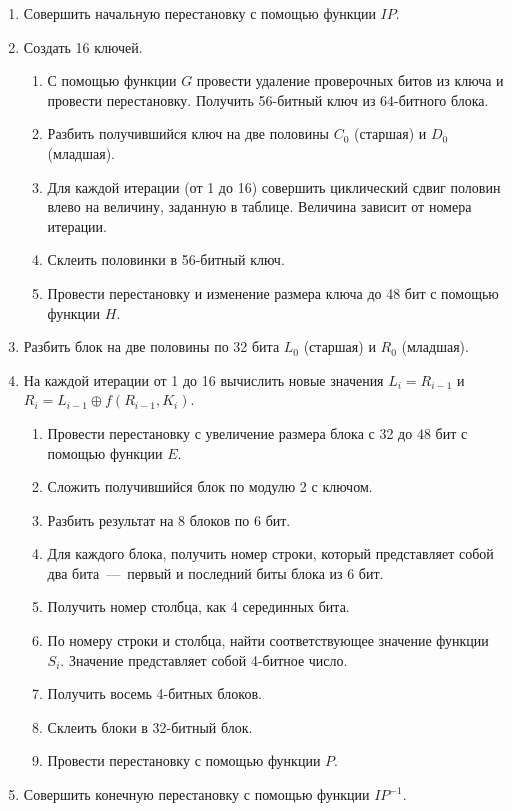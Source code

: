 \begin{enumerate}
	\item Совершить начальную перестановку с помощью функции $IP$.
	\item Создать 16 ключей.
	
	\begin{enumerate}
		\item С помощью функции $G$ провести удаление проверочных битов из ключа и провести перестановку. Получить 56-битный ключ из 64-битного блока.
		\item Разбить получившийся ключ на две половины $C_0$ (старшая) и $D_0$ (младшая).
		\item Для каждой итерации (от 1 до 16) совершить циклический сдвиг половин влево на величину, заданную в таблице. Величина зависит от номера итерации.
		\item Склеить половинки в 56-битный ключ.
		\item Провести перестановку и изменение размера ключа до 48 бит с помощью функции $H$.
	\end{enumerate}
	
	\item Разбить блок на две половины по 32 бита $L_0$ (старшая) и $R_0$ (младшая).
	\item На каждой итерации от 1 до 16 вычислить новые значения $L_{i} = R_{i-1}$ и $R_{i} = L_{i-1} \oplus f(R_{i-1}, K_i)$.
	
	\begin{enumerate}
		\item Провести перестановку с увеличение размера блока с 32 до 48 бит с помощью функции $E$.
		\item Сложить получившийся блок по модулю 2 с ключом.
		\item Разбить результат на 8 блоков по 6 бит.
		\item Для каждого блока, получить номер строки, который представляет собой два бита~---~первый и последний биты блока из 6 бит.
		\item Получить номер столбца, как 4 серединных бита.
		\item По номеру строки и столбца, найти соответствующее значение функции $S_i$. Значение представляет собой 4-битное число.
		\item Получить восемь 4-битных блоков.
		\item Склеить блоки в 32-битный блок.
		\item Провести перестановку с помощью функции $P$.
	\end{enumerate}
	
	\item Совершить конечную перестановку с помощью функции $IP^{-1}$.
\end{enumerate}

